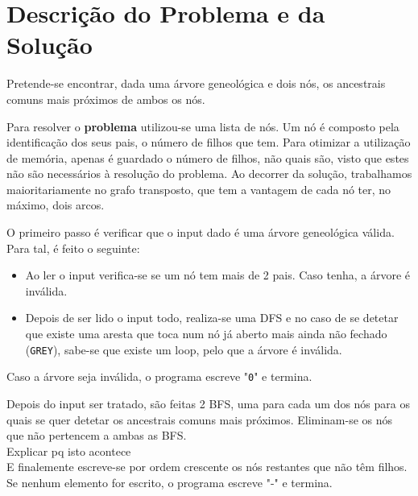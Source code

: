 \documentclass[12pt,a4paper]{article}
\begin{document}
  \section{Descrição do Problema e da Solução}

  Pretende-se encontrar, dada uma árvore geneológica e dois nós, os ancestrais comuns mais próximos de ambos os nós.

  Para resolver o \textbf{problema} utilizou-se uma lista de nós.
  Um nó é composto pela identificação dos seus pais, o número de filhos que tem.
  Para otimizar a utilização de memória, apenas é guardado o número de filhos, não quais são, visto que estes não são necessários à resolução do problema.
  Ao decorrer da solução, trabalhamos maioritariamente no grafo transposto, que tem a vantagem de cada nó ter, no máximo, dois arcos.

  O primeiro passo é verificar que o input dado é uma árvore geneológica válida.
  Para tal, é feito o seguinte:
  
  \begin{itemize}
    \setlength{\itemsep}{0pt}
      \item Ao ler o input verifica-se se um nó tem mais de 2 pais. Caso tenha, a árvore é inválida.
      \item Depois de ser lido o input todo, realiza-se uma DFS e no caso de se detetar que existe uma aresta que toca num nó já aberto mais ainda não fechado (\texttt{GREY}), sabe-se que existe um loop, pelo que a árvore é inválida.
  \end{itemize}

  Caso a árvore seja inválida, o programa escreve "\texttt{0}" e termina.


  Depois do input ser tratado, são feitas 2 BFS, uma para cada um dos nós para os quais se quer detetar os ancestrais comuns mais próximos.
  Eliminam-se os nós que não pertencem a ambas as BFS.\\
  Explicar pq isto acontece\\
  E finalemente escreve-se por ordem crescente os nós restantes que não têm filhos.\\
 Se nenhum elemento for escrito, o programa escreve "-" e termina.
\end{document}
